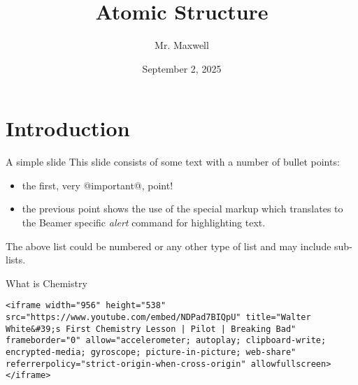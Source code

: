 \documentclass[presentation]{beamer}
\author{Mr. Maxwell}
\date{September 2, 2025}
\title{Atomic Structure}
\begin{document}
\maketitle


\section{Introduction}
\label{sec:org83693b5}
\begin{frame}[label={sec:org990dc56}]{A simple slide}
This slide consists of some text with a number of bullet points:

\begin{itemize}
\item the first, very @important@, point!
\item the previous point shows the use of the special markup which
translates to the Beamer specific \emph{alert} command for highlighting
text.
\end{itemize}


The above list could be numbered or any other type of list and may
include sub-lists.
\end{frame}

\begin{frame}[label={sec:orgacea280},fragile]{What is Chemistry}
 \begin{verbatim}
<iframe width="956" height="538" src="https://www.youtube.com/embed/NDPad7BIQpU" title="Walter White&#39;s First Chemistry Lesson | Pilot | Breaking Bad" frameborder="0" allow="accelerometer; autoplay; clipboard-write; encrypted-media; gyroscope; picture-in-picture; web-share" referrerpolicy="strict-origin-when-cross-origin" allowfullscreen></iframe>
\end{verbatim}
\end{frame}
\end{document}
